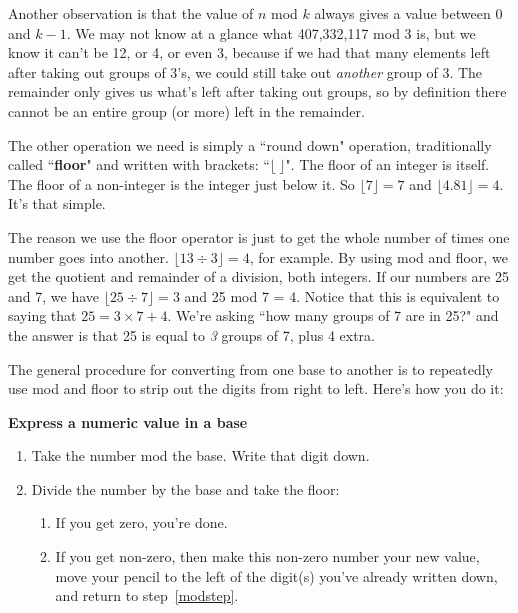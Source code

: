 Another observation is that the value of $n$ mod $k$ always gives a value
between 0 and $k-1$. We may not know at a glance what 407,332,117 mod 3 is,
but we know it can't be 12, or 4, or even 3, because if we had that many
elements left after taking out groups of 3's, we could still take out
\textit{another} group of 3. The remainder only gives us what's left after
taking out groups, so by definition there cannot be an entire group (or
more) left in the remainder.

The other operation we need is simply a ``round down" operation,
traditionally called ``\textbf{floor}" and written with brackets:
``$\lfloor \ \rfloor$". The floor of an integer is itself. The floor of a
non-integer is the integer just below it. So $\lfloor 7 \rfloor = 7$ and
$\lfloor 4.81 \rfloor = 4$. It's that simple.

The reason we use the floor operator is just to get the whole number of
times one number goes into another. $\lfloor 13 \div 3 \rfloor = 4$, for
example. By using mod and floor, we get the quotient and remainder of a
division, both integers. If our numbers are 25 and 7, we have $\lfloor 25
\div 7 \rfloor = 3$ and 25 mod 7 = 4. Notice that this is equivalent to
saying that $25 = 3 \times 7 + 4$. We're asking ``how many groups of 7 are
in 25?" and the answer is that 25 is equal to \textit{3} groups of 7, plus
4 extra.

The general procedure for converting from one base to another is to
repeatedly use mod and floor to strip out the digits from right to left. 
Here's how you do it:

\vspace{.1in}
\begin{samepage}
\textbf{Express a numeric value in a base}
\label{convertalgorithm}
\begin{enumerate}
\item \label{modstep} Take the number mod the base. Write that digit down.
\item \label{divstep} Divide the number by the base and take the floor:
    \begin{enumerate}
    \item \label{zerostep} If you get zero, you're done.
    \item \label{notzerostep} If you get non-zero, then make this non-zero
number your new value, move your pencil to the left of the digit(s) you've
already written down, and return to step~\ref{modstep}.
    \end{enumerate}
\end{enumerate}
\end{samepage}
\vspace{.2in}

